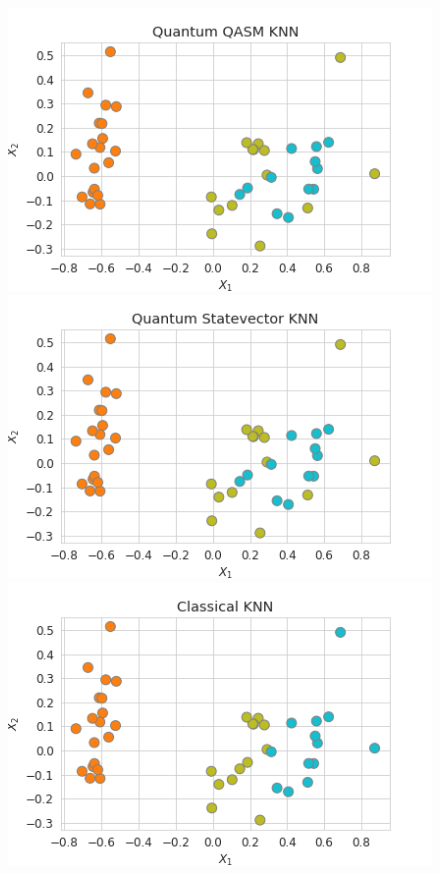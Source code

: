 \documentclass{article}
\begin{document}
\begin{multicols}{2}
\begin{figure}[H]
  \centering
    \includegraphics[width=\linewidth]{assets/knn/Quantum QASM KNN.png}
    \includegraphics[width=\linewidth]{assets/knn/Quantum Statevector KNN.png}
    \includegraphics[width=\linewidth]{assets/knn/Classical KNN.png}

\end{figure}
\end{multicols}
\end{document}

